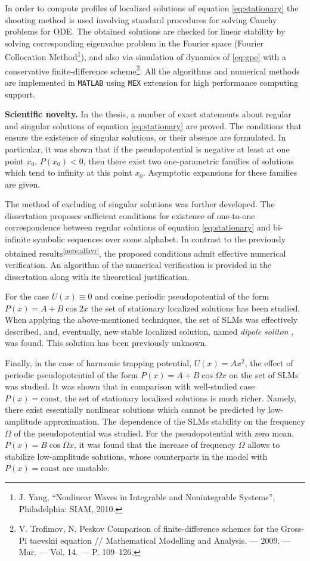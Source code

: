 \documentclass[candidate, href, colorlinks]{disser}
\begin{document}
In order to compute profiles of localized solutions of equation \eqref{eq:stationary} the shooting method is used involving standard procedures for solving Cauchy problems for ODE.
The obtained solutions are checked for linear stability by solving corresponding eigenvalue problem in the Fourier space (Fourier Collocation Method\footnote{J. Yang, ``Nonlinear Waves in Integrable and Nonintegrable Systems'', Philadelphia: SIAM, 2010.}), and also via simulation of dynamics of \eqref{eq:gpe} with a conservative finite-difference scheme\footnote{V. Trofimov, N. Peskov Comparison of finite-difference schemes for the Gross-Pi­ taevskii equation // Mathematical Modelling and Analysis. — 2009. — Mar. — Vol. 14. — P. 109–126.}.
All the algorithms and numerical methods are implemented in {\tt MATLAB} using {\tt MEX} extension for high performance computing support.

\textbf{Scientific novelty.}
In the thesis, a number of exact statements about regular and singular solutions of equation \eqref{eq:stationary} are proved.
The conditions that ensure the existence of singular solutions, or their absence are formulated.
In particular, it was shown that if the pseudopotential is negative at least at one point $x_0$, $P(x_0) < 0$, then there exist two one-parametric families of solutions which tend to infinity at this point $x_0$.
Asymptotic expansions for these families are given.

The method of excluding of singular solutions was further developed.
The dissertation proposes sufficient conditions for existence of one-to-one correspondence between regular solutions of equation \eqref{eq:stationary} and bi-infinite symbolic sequences over some alphabet. 
In contrast to the previously obtained results\textsuperscript{\ref{note:alfavr}}, the proposed conditions admit effective numerical verification.
An algorithm of the numerical verification is provided in the dissertation along with its theoretical justification.

For the case $U(x) \equiv 0$ and cosine periodic pseudopotential of the form $P(x) = A + B \cos 2x$ the set of stationary localized solutions has been studied.
When applying the above-mentioned techniques, the set of SLMs was effectively described, and, eventually, new stable localized solution, named {\it dipole soliton} \cite{LebedevAlfimovMalomed}, was found.
This solution has been previously unknown.

Finally, in the case of harmonic trapping potential, $U(x) = A x^2$, the effect of periodic pseudopotential of the form $P(x) = A + B \cos \Omega x$ on the set of SLMs was studied.
It was shown that in comparison with well-studied case $P(x) = \mathrm{const}$, the set of stationary localized solutions is much richer.
Namely, there exist essentially nonlinear solutions which cannot be predicted by low-amplitude approximation.
The dependence of the SLMs stability on the frequency $\Omega$ of the pseudopotential was studied.
For the pseudopotential with zero mean, $P(x) = B \cos \Omega x$, it was found that the increase of frequency $\Omega$ allows to stabilize low-amplitude solutions, whose counterparts in the model with $P(x) = \mathrm{const}$ are unstable.
\end{document}
